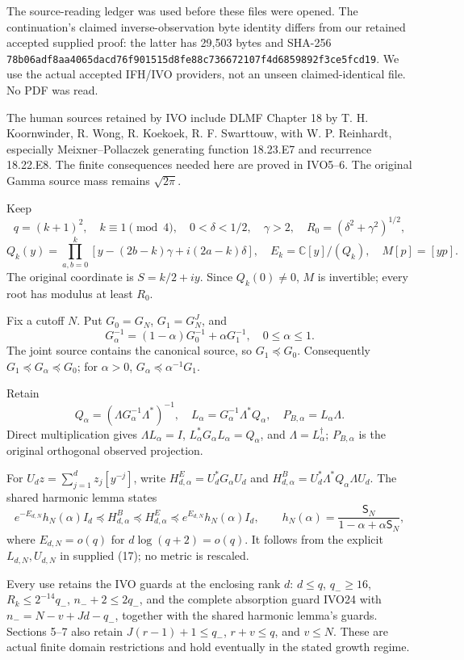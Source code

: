 \documentclass[11pt]{article}
\begin{document}
The source-reading ledger was used before these files were opened. The continuation's claimed inverse-observation byte identity differs from our retained accepted supplied proof: the latter has 29,503 bytes and SHA-256 \nolinkurl{78b06adf8aa4065dacd76f901515d8fe88c736672107f4d6859892f3ce5fcd19}. We use the actual accepted IFH/IVO providers, not an unseen claimed-identical file. No PDF was read.

The human sources retained by IVO include DLMF Chapter 18 by T. H. Koornwinder, R. Wong, R. Koekoek, R. F. Swarttouw, with W. P. Reinhardt, especially Meixner--Pollaczek generating function 18.23.E7 and recurrence 18.22.E8. The finite consequences needed here are proved in IVO5--6. The original Gamma source mass remains \(\sqrt{2\pi}\).

Keep \[
q=(k+1)^2,\quad k\equiv1\pmod4,\quad 0<\delta<1/2,\quad\gamma>2,\quad
R_0=(\delta^2+\gamma^2)^{1/2},
\] \[
Q_k(y)=\prod_{a,b=0}^k[y-(2b-k)\gamma+i(2a-k)\delta],\quad
E_k=\mathbb C[y]/(Q_k),\quad M[p]=[yp].
\] The original coordinate is \(S=k/2+iy\). Since \(Q_k(0)\ne0\), \(M\) is invertible; every root has modulus at least \(R_0\).

Fix a cutoff \(N\). Put \(G_0=G_N\), \(G_1=G_N^J\), and \[
G_\alpha^{-1}=(1-\alpha)G_0^{-1}+\alpha G_1^{-1},\quad0\le\alpha\le1.
\tag{ACT1}
\] The joint source contains the canonical source, so \(G_1\preceq G_0\). Consequently \(G_1\preceq G_\alpha\preceq G_0\); for \(\alpha>0\), \(G_\alpha\preceq\alpha^{-1}G_1\).

Retain \[
Q_\alpha=(\Lambda G_\alpha^{-1}\Lambda^*)^{-1},\quad
L_\alpha=G_\alpha^{-1}\Lambda^*Q_\alpha,\quad P_{B,\alpha}=L_\alpha\Lambda.
\] Direct multiplication gives \(\Lambda L_\alpha=I\), \(L_\alpha^*G_\alpha L_\alpha=Q_\alpha\), and \(\Lambda=L_\alpha^\dagger\); \(P_{B,\alpha}\) is the original orthogonal observed projection.

For \(U_dz=\sum_{j=1}^dz_j[y^{-j}]\), write \(H^E_{d,\alpha}=U_d^*G_\alpha U_d\) and \(H^B_{d,\alpha}=U_d^*\Lambda^*Q_\alpha\Lambda U_d\). The shared harmonic lemma states \[
e^{-E_{d,N}}h_N(\alpha)I_d\preceq H^B_{d,\alpha}\preceq H^E_{d,\alpha}
 \preceq e^{E_{d,N}}h_N(\alpha)I_d,\qquad
h_N(\alpha)=\frac{\mathsf S_N}{1-\alpha+\alpha\mathsf S_N},
\tag{ACT2}
\] where \(E_{d,N}=o(q)\) for \(d\log(q+2)=o(q)\). It follows from the explicit \(L_{d,N},U_{d,N}\) in supplied (17); no metric is rescaled.

Every use retains the IVO guards at the enclosing rank \(d\): \(d\le q\), \(q_-\ge16\), \(R_k\le2^{-14}q_-\), \(n_-+2\le2q_-\), and the complete absorption guard IVO24 with \(n_-=N-v+Jd-q_-\), together with the shared harmonic lemma's guards. Sections 5--7 also retain \(J(r-1)+1\le q_-\), \(r+v\le q\), and \(v\le N\). These are actual finite domain restrictions and hold eventually in the stated growth regime.
\end{document}
